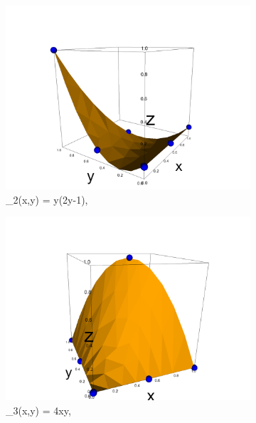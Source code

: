 \documentclass[12pt,a4paper]{article}
\begin{document}
\begin{figure}[H]
\begin{subfigure}{0.5\textwidth}
     \includegraphics[width=\textwidth]{Pics/BasisFunc/triBasis2.png}
     \caption{\phi_2(x,y) = y(2y-1),}
 \end{subfigure}
 \hfill
 \begin{subfigure}{0.5\textwidth}
     \includegraphics[width=\textwidth]{Pics/BasisFunc/triBasis3.png}
     \caption{\phi_3(x,y) = 4xy,}
 \end{subfigure}
 \hfill
 \begin{subfigure}{0.5\textwidth}

\end{subfigure}
\end{figure}
\end{document}
